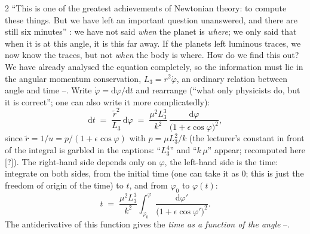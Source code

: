 \begin{paracol}{2}
``This is one of the greatest achievements of Newtonian theory: to compute these things. But we have left an important question unanswered, and there are still six minutes'' : we have not said \emph{when} the planet is \emph{where}; we only said that when it is at this angle, it is this far away. If the planets left luminous traces, we now know the traces, but not \emph{when} the body is where. How do we find this out? We have already analysed the equation completely, so the information must lie in the angular momentum conservation, $L_3=r^2\dot\varphi$, an ordinary relation between angle and time
--. Write $\dot\varphi=\mathrm d\varphi/\mathrm dt$ and rearrange (``what only physicists do, but it is correct''; one can also write it more complicatedly):
\begin{equation}\label{eq:tb-dt}
  \mathrm dt\;=\;\frac{\tilde r^2}{L_3}\,\mathrm d\varphi\;=\;\frac{\mu^2L_3^3}{k^2}\,\frac{\mathrm d\varphi}{\bigl(1+\epsilon\cos\varphi\bigr)^2},
\end{equation}
since $\tilde r=1/u=p/(1+\epsilon\cos\varphi)$ with $p=\mu L_3^2/k$ (the lecturer's constant in front of the integral is garbled in the captions: ``$L_3^4$'' and ``$k\,\mu$'' appear; recomputed here [?]). The right-hand side depends only on $\varphi$, the left-hand side is the time: integrate on both sides, from the initial time (one can take it as $0$; this is just the freedom of origin of the time) to $t$, and from $\varphi_0$ to $\varphi(t)$:
\begin{equation}\label{eq:tb-time}
  t\;=\;\frac{\mu^2L_3^3}{k^2}\int_{\varphi_0}^{\varphi}\frac{\mathrm d\varphi'}{\bigl(1+\epsilon\cos\varphi'\bigr)^2}.
\end{equation}
The antiderivative of this function gives the \emph{time as a function of the angle} --.


\end{paracol}

